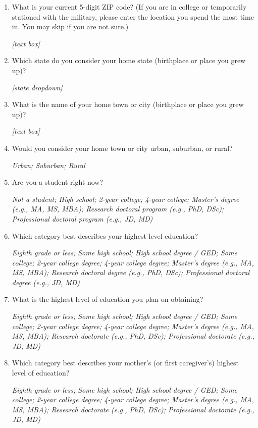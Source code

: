 \documentclass[11pt, headsepline]{article}
\begin{document}
\begin{enumerate}[resume]
    \textit{[state dropdown]}

    \item What is your current 5-digit ZIP code? (If you are in college or temporarily stationed with the military, please enter the location you spend the most time in. You may skip if you are not sure.)

    \textit{[text box]}

    \item Which state do you consider your home state (birthplace or place you grew up)?

    \textit{[state dropdown]}

    \item What is the name of your home town or city (birthplace or place you grew up)?

    \textit{[text box]}

    \item Would you consider your home town or city urban, suburban, or rural?

    \textit{Urban; Suburban; Rural}

    \item Are you a student right now?

    \textit{Not a student; High school; 2-year college; 4-year college; Master’s degree (e.g., MA, MS, MBA); Research doctoral program (e.g., PhD, DSc); Professional doctoral program (e.g., JD, MD)}

    \item Which category best describes your highest level education?

    \textit{Eighth grade or less; Some high school; High school degree / GED; Some college; 2-year college degree; 4-year college degree; Master’s degree (e.g., MA, MS, MBA); Research doctoral degree (e.g., PhD, DSc); Professional doctoral degree (e.g., JD, MD)}

    \item What is the highest level of education you plan on obtaining?

    \textit{Eighth grade or less; Some high school; High school degree / GED; Some college; 2-year college degree; 4-year college degree; Master’s degree (e.g., MA, MS, MBA); Research doctorate (e.g., PhD, DSc); Professional doctorate (e.g., JD, MD)}

    \item Which category best describes your mother's (or first caregiver's) highest level of education?

    \textit{Eighth grade or less; Some high school; High school degree / GED; Some college; 2-year college degree; 4-year college degree; Master’s degree (e.g., MA, MS, MBA); Research doctorate (e.g., PhD, DSc); Professional doctorate (e.g., JD, MD)}


\end{enumerate}
\end{document}
